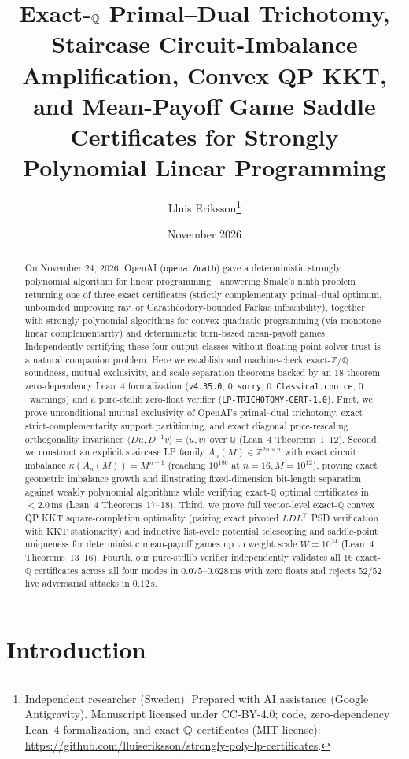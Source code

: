 \documentclass[11pt,a4paper]{article}
\title{\bfseries Exact-$\QQ$ Primal--Dual Trichotomy, Staircase Circuit-Imbalance Amplification, Convex QP KKT, and Mean-Payoff Game Saddle Certificates for Strongly Polynomial Linear Programming}
\author{Lluis Eriksson\thanks{Independent researcher (Sweden). Prepared with AI assistance (Google Antigravity). Manuscript licensed under CC-BY-4.0; code, zero-dependency Lean~4 formalization, and exact-$\QQ$ certificates (MIT license):\\ \url{https://github.com/lluiseriksson/strongly-poly-lp-certificates}.}}
\date{November 2026}
\theoremstyle{definition}
\theoremstyle{remark}
\newcommand{\QQ}{\mathbb{Q}}
\newcommand{\ZZ}{\mathbb{Z}}
\newcommand{\certschema}{\texttt{LP-TRICHOTOMY-CERT-1.0}}
\begin{document}
\maketitle

\begin{abstract}
On November 24, 2026, OpenAI (\texttt{openai/math}) gave a deterministic strongly polynomial algorithm for linear programming---answering Smale's ninth problem---returning one of three exact certificates (strictly complementary primal--dual optimum, unbounded improving ray, or Carath\'eodory-bounded Farkas infeasibility), together with strongly polynomial algorithms for convex quadratic programming (via monotone linear complementarity) and deterministic turn-based mean-payoff games. Independently certifying these four output classes without floating-point solver trust is a natural companion problem. Here we establish and machine-check exact-$\ZZ$/$\QQ$ soundness, mutual exclusivity, and scale-separation theorems backed by an $18$-theorem zero-dependency Lean~4 formalization (\texttt{v4.35.0}, $0$~\texttt{sorry}, $0$~\texttt{Classical.choice}, $0$~warnings) and a pure-stdlib zero-float verifier (\certschema{}). First, we prove unconditional mutual exclusivity of OpenAI's primal--dual trichotomy, exact strict-complementarity support partitioning, and exact diagonal price-rescaling orthogonality invariance $\langle D u, D^{-1} v\rangle = \langle u, v\rangle$ over $\QQ$ (Lean~4 Theorems~1--12). Second, we construct an explicit staircase LP family $A_n(M) \in \ZZ^{2n\times n}$ with exact circuit imbalance $\kappa(A_n(M)) = M^{n-1}$ (reaching $10^{180}$ at $n=16, M=10^{12}$), proving exact geometric imbalance growth and illustrating fixed-dimension bit-length separation against weakly polynomial algorithms while verifying exact-$\QQ$ optimal certificates in $< 2.0\,\mathrm{ms}$ (Lean~4 Theorems~17--18). Third, we prove full vector-level exact-$\QQ$ convex QP KKT square-completion optimality (pairing exact pivoted $LDL^\top$ PSD verification with KKT stationarity) and inductive list-cycle potential telescoping and saddle-point uniqueness for deterministic mean-payoff games up to weight scale $W = 10^{24}$ (Lean~4 Theorems~13--16). Fourth, our pure-stdlib verifier independently validates all $16$ exact-$\QQ$ certificates across all four modes in $0.075$--$0.628\,\mathrm{ms}$ with zero floats and rejects $52/52$ live adversarial attacks in $0.12\,\mathrm{s}$.
\end{abstract}

\section{Introduction}
\end{document}
